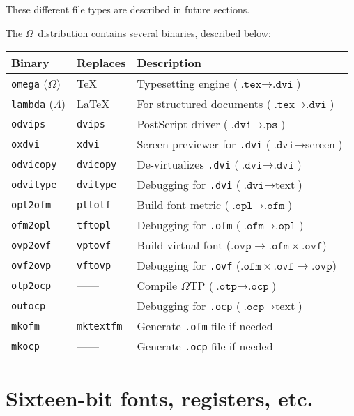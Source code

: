 \documentclass[fleqn]{article}
\newcommand{\OMEGA}{$\Omega$}
\newcommand{\LAMBDA}{$\Lambda$}
\newcommand{\OTP}{\OMEGA TP}
\begin{document}
\noindent These different file types are described in future sections.

\noindent
The \OMEGA\ distribution contains several binaries, described below:
\vspace*{.2cm}

\begin{tabular}{lll}
Binary & Replaces & Description\\
\hline
\texttt{omega} (\OMEGA) & \TeX & Typesetting engine
    ($\texttt{.tex} \rightarrow \texttt{.dvi}$) \\
\texttt{lambda} (\LAMBDA) & \LaTeX & For structured documents
    ($\texttt{.tex} \rightarrow \texttt{.dvi}$) \\
\texttt{odvips} & \texttt{dvips} & PostScript driver
    ($\texttt{.dvi} \rightarrow \texttt{.ps}$) \\
\texttt{oxdvi} & \texttt{xdvi} & Screen previewer for \texttt{.dvi}
    ($\texttt{.dvi} \rightarrow \textrm{screen}$) \\
\texttt{odvicopy} & \texttt{dvicopy} & De-virtualizes \texttt{.dvi}
    ($\texttt{.dvi} \rightarrow \texttt{.dvi}$) \\
\texttt{odvitype} & \texttt{dvitype} & Debugging for \texttt{.dvi}
    ($\texttt{.dvi} \rightarrow \textrm{text}$) \\
\texttt{opl2ofm} & \texttt{pltotf} & Build font metric
    ($\texttt{.opl} \rightarrow \texttt{.ofm}$) \\
\texttt{ofm2opl} & \texttt{tftopl} & Debugging for \texttt{.ofm}
    ($\texttt{.ofm} \rightarrow \texttt{.opl}$) \\
\texttt{ovp2ovf} & \texttt{vptovf} & Build virtual font
    ($\texttt{.ovp} \rightarrow \texttt{.ofm}\times\texttt{.ovf}$) \\
\texttt{ovf2ovp} & \texttt{vftovp} & Debugging for \texttt{.ovf}
    ($\texttt{.ofm}\times\texttt{.ovf} \rightarrow \texttt{.ovp}$) \\
\texttt{otp2ocp} & ------ & Compile \OTP{}
    ($\texttt{.otp} \rightarrow \texttt{.ocp}$) \\
\texttt{outocp} & ------ & Debugging for \texttt{.ocp}
    ($\texttt{.ocp} \rightarrow \textrm{text}$)\\
\texttt{mkofm} & \texttt{mktextfm} & Generate \texttt{.ofm} file if needed\\
\texttt{mkocp} & ------ & Generate \texttt{.ocp} file if needed\\
\end{tabular}

\section{Sixteen-bit fonts, registers, etc.}
\end{document}
